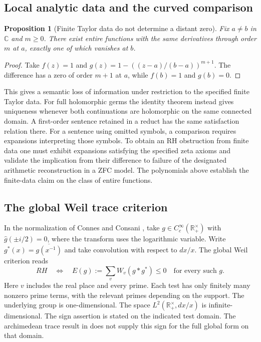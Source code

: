 \documentclass{article}
\newtheorem{proposition}[theorem]{Proposition}
\theoremstyle{definition}
\begin{document}
\subsection{Local analytic data and the curved comparison}
\begin{proposition}[Finite Taylor data do not determine a distant zero]
Fix $a\ne b$ in $\mathbb C$ and $m\ge0$. There exist entire functions
with the same derivatives through order $m$ at $a$, exactly one of which
vanishes at $b$.
\end{proposition}
\begin{proof}
Take $f(z)=1$ and $g(z)=1-((z-a)/(b-a))^{m+1}$.
The difference has a zero of order $m+1$ at $a$, while $f(b)=1$ and $g(b)=0$.
\end{proof}
This gives a semantic loss of information under restriction to the specified
finite Taylor data. For full holomorphic germs the identity theorem instead
gives uniqueness whenever both continuations are holomorphic on the same
connected domain. A first-order sentence retained in a reduct has the same
satisfaction relation there. For a sentence using omitted symbols, a
comparison requires expansions interpreting those symbols. To obtain an RH
obstruction from finite data one must exhibit expansions satisfying the
specified zeta axioms and validate the implication from their difference to
failure of the designated arithmetic reconstruction in a ZFC model.
The polynomials above establish the finite-data claim on the class of entire
functions.

\subsection{The global Weil trace criterion}
In the normalization of Connes and Consani \cite[Eq.~(4)]{ConnesConsaniWeil},
take $g\in C_c^\infty(\mathbb R_+^\times)$ with
$\widehat g(\pm i/2)=0$, where the transform uses the logarithmic variable.
Write $g^*(x)=\overline{g(x^{-1})}$ and take convolution with respect to
$dx/x$. The global Weil criterion reads
\[
 RH\quad\Longleftrightarrow\quad
 E(g):=\sum_v W_v(g*g^*)\le0\quad\text{for every such }g .
\]
Here $v$ includes the real place and every prime. Each test has only finitely
many nonzero prime terms, with the relevant primes depending on the support.
The underlying group is one-dimensional. The space $L^2(\mathbb R_+^\times,dx/x)$ is
infinite-dimensional. The sign assertion is stated on the indicated test
domain. The archimedean trace result in \cite{ConnesConsaniWeil} does not
supply this sign for the full global form on that domain.
\end{document}
